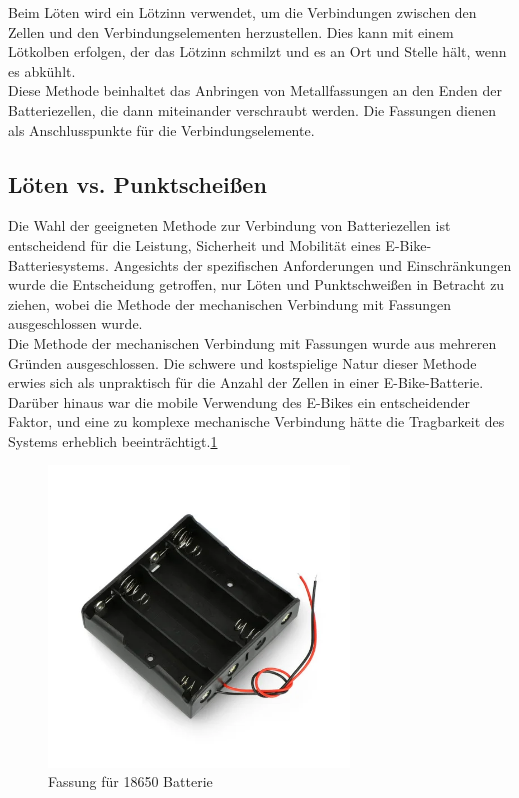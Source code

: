 Beim Löten wird ein Lötzinn verwendet, um die Verbindungen zwischen den Zellen und den Verbindungselementen herzustellen.
Dies kann mit einem Lötkolben erfolgen, der das Lötzinn schmilzt und es an Ort und Stelle hält, wenn es abkühlt.\\

Diese Methode beinhaltet das Anbringen von Metallfassungen an den Enden der Batteriezellen, die dann miteinander verschraubt werden.
Die Fassungen dienen als Anschlusspunkte für die Verbindungselemente.\\

\subsection{Löten vs. Punktscheißen}
Die Wahl der geeigneten Methode zur Verbindung von Batteriezellen ist entscheidend für die Leistung, Sicherheit und Mobilität eines E-Bike-Batteriesystems.
Angesichts der spezifischen Anforderungen und Einschränkungen wurde die Entscheidung getroffen, nur Löten und Punktschweißen in Betracht zu ziehen, wobei die Methode der mechanischen Verbindung mit Fassungen ausgeschlossen wurde.\\

Die Methode der mechanischen Verbindung mit Fassungen wurde aus mehreren Gründen ausgeschlossen.
Die schwere und kostspielige Natur dieser Methode erwies sich als unpraktisch für die Anzahl der Zellen in einer E-Bike-Batterie.
Darüber hinaus war die mobile Verwendung des E-Bikes ein entscheidender Faktor, und eine zu komplexe mechanische Verbindung hätte die Tragbarkeit des Systems erheblich beeinträchtigt.\ref{fig:2}\\
\begin{figure}[h]
    \centering
    \includegraphics[width=8cm]{images/korb-fur-4-18650-akkus-reihenschaltung.png}
    \caption{ Fassung für 18650 Batterie\cite{noauthor_korb_2024}}%
    \label{fig:2}
\end{figure}


